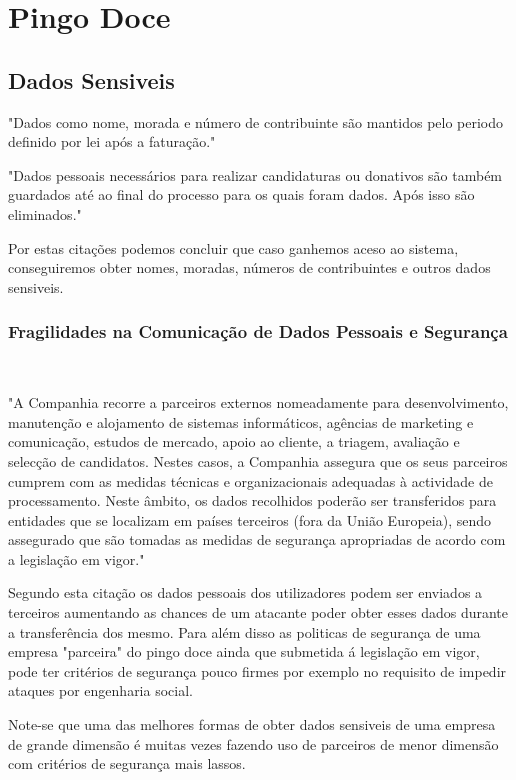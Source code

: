 \section{Pingo Doce}
\subsection{Dados Sensiveis}

\par "Dados como nome, morada e número de contribuinte são mantidos pelo periodo definido por lei após a faturação."\newline

\par "Dados pessoais necessários para realizar candidaturas ou donativos são também guardados até ao final do processo para os quais foram dados. Após isso são eliminados."\newline

\par Por estas citações podemos concluir que caso ganhemos aceso ao sistema, conseguiremos obter nomes, moradas, números de contribuintes e outros dados sensiveis.



\subsubsection{Fragilidades na Comunicação de Dados Pessoais e Segurança}
\hfill\\

\par "A Companhia recorre a parceiros externos nomeadamente para desenvolvimento, manutenção e alojamento de sistemas informáticos, agências de marketing e comunicação, estudos de mercado, apoio ao cliente, a triagem, avaliação e selecção de candidatos. Nestes casos, a Companhia assegura que os seus parceiros cumprem com as medidas técnicas e organizacionais adequadas à actividade de processamento. Neste âmbito, os dados recolhidos poderão ser transferidos para entidades que se localizam em países terceiros (fora da União Europeia), sendo assegurado que são tomadas as medidas de segurança apropriadas de acordo com a legislação em vigor."\newline


\par Segundo esta citação os dados pessoais dos utilizadores podem ser enviados a terceiros aumentando as chances de um atacante poder obter esses dados durante a transferência dos mesmo. Para além disso as politicas de segurança de uma empresa "parceira" do pingo doce ainda que submetida á legislação em vigor, pode ter critérios de segurança pouco firmes por exemplo no requisito de impedir ataques por engenharia social.\newline
\par Note-se que uma das melhores formas de obter dados sensiveis de uma empresa de grande dimensão é muitas vezes fazendo uso de parceiros de menor dimensão com critérios de segurança mais lassos.


